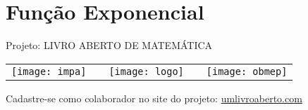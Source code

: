 
\ifnum{}
\renewcommand\chapterillustration{./abertura-exponencial}
\else
\renewcommand\chapterillustration{./abertura-exponencial-professor}
\fi
\renewcommand\chapterwhat{Crescimento e decaimento exponenciais, função exponencial, juros compostos, progressão geométrica, expoentes racionais e irracionais.}
\renewcommand\chapterbecause{Dizemos que estamos diante de um crescimento exponencial sempre que o aumento percentual de determinada quantidade por unidade de tempo é constante. Este é o caso das medições econômicas, financeiras e políticas de crescimento - de vendas, lucros, preços de ações, produto interno bruto, inflação, taxas de juros. Assim, compreender bem o crescimento exponencial é crucial para compreender o mundo.}
\chapter{Função Exponencial}



\mbox{}\thispagestyle{empty}\clearpage

\thispagestyle{empty}

\begin{center}
Projeto: LIVRO ABERTO DE MATEMÁTICA

 \begin{tabular}{lcccr}
\texttt{[image: impa]}& \quad\quad& \texttt{[image: logo]} & \quad\quad& \texttt{[image: obmep]} 
\end{tabular}
\end{center}

\vspace*{.3cm}

Cadastre-se como colaborador no site do projeto: \url{umlivroaberto.com}




